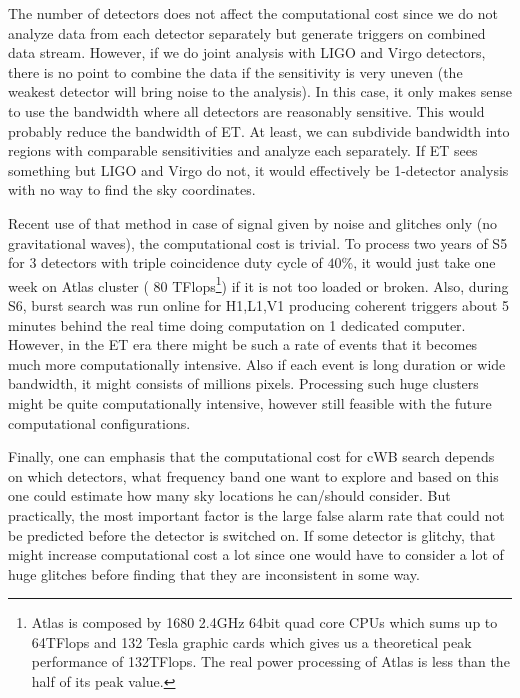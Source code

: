 The number of detectors does not affect  the computational cost since we do not analyze data from each detector separately but generate triggers on combined data stream. %
However, if we do joint analysis with LIGO and Virgo detectors, there is no point to combine the data if the sensitivity is very uneven (the weakest detector will bring noise to the analysis). In this case,  it only makes sense to use the bandwidth where all detectors are reasonably sensitive. This would probably reduce the bandwidth of ET. At least,  we can subdivide bandwidth into regions with comparable sensitivities and analyze each separately. If ET sees something but LIGO and Virgo do not, it would effectively be 1-detector analysis with no way to find the sky coordinates.

Recent use of that method in case of signal given by noise and glitches only (no gravitational waves),  the computational cost is trivial. To process two years of S5 for 3 detectors with triple coincidence duty cycle of  $40\%$, it would just take one week  on Atlas cluster ( 80 TFlops\footnote{Atlas is composed by 1680 2.4GHz 64bit quad core CPUs which sums up to 64TFlops and 132 Tesla graphic cards which gives us a theoretical peak performance of  132TFlops. The real power processing of Atlas is less than the half of its peak value.}) if it is not too loaded or broken. Also, during S6,  burst search was run online for H1,L1,V1 producing coherent triggers about 5 minutes behind the real time doing computation on 1 dedicated computer. However, in the ET era there might be such a rate of events that it becomes much more computationally intensive. Also if each event is long duration or wide bandwidth, it might consists of millions pixels. Processing such huge clusters might be quite computationally intensive, however still feasible with the future computational configurations.

Finally, one can emphasis that the computational cost for cWB search  depends on which detectors, what frequency band one want to explore and based on this one could estimate how many sky locations he can/should consider.
 But practically, the most important factor is the large false alarm rate that could not be predicted before the detector is switched on. If some detector is glitchy, that might increase computational cost a lot since one would have to consider a lot of huge glitches before finding that
they are inconsistent in some way.

